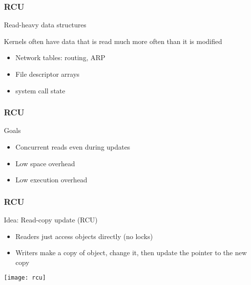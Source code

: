\begin{frame}[fragile]
    \frametitle{RCU}
    \Large
    Read-heavy data structures
    
    Kernels often have data that is read much more
    often than it is modified
   
    \begin{itemize}
        \item Network tables: routing, ARP
        \item File descriptor arrays
        \item  system call state
    \end{itemize}
    
\end{frame}

\begin{frame}[fragile]
    \frametitle{RCU}
    \Large
   Goals
    
    \begin{itemize}
        \item Concurrent reads even during updates
        \item Low space overhead
        \item Low execution overhead
    \end{itemize}
    
\end{frame}


\begin{frame}[fragile]
    \frametitle{RCU}
    \Large
    Idea: Read-copy update (RCU)
    \begin{itemize}
        \item  Readers just access objects directly (no locks)
        \item  Writers make a copy of object, change it, then
        update the pointer to the new copy
    \end{itemize}
    \centering
    \texttt{[image: rcu]}
\end{frame}

